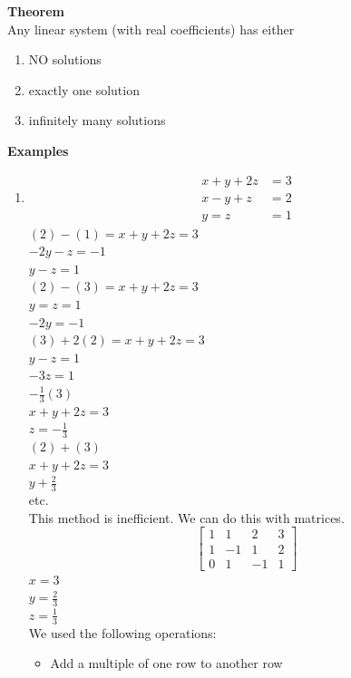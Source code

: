 \documentclass[]{article}
\begin{document}
		{\bf Theorem}\\
		Any linear system (with real coefficients) has either
		\begin{enumerate}
			\item NO solutions
			\item exactly one solution
			\item infinitely many solutions
		\end{enumerate}
		\pagebreak
		{\bf Examples}
		\begin{enumerate}
			\item \begin{align}
				x+y+2z&=3\\
				x-y+z&=2\\
				y=z&=1
			\end{align}
			$(2)-(1)=x+y+2z=3$\\
			$-2y-z=-1$\\
			\vspace{5mm}
			$y-z=1$\\
			$(2)-(3)=x+y+2z=3$\\
			$y=z=1$\\
			\vspace{5mm}
			$-2y=-1$\\
			$(3)+2(2)=x+y+2z=3$\\
			$y-z=1$\\
			\vspace{5mm}
			$-3z=1$\\
			$-\frac{1}{3}(3)$\\
			$x+y+2z=3$\\
			\vspace{5mm}
			$z=-\frac{1}{3}$\\
			$(2)+(3)$\\
			$x+y+2z=3$\\
			$y+\frac{2}{3}$\\
			etc.\\
			This method is inefficient. We can do this with matrices.
			$$
				\left[\begin{array}{ccc|c}
					{1}&{1}&{2}&{3}\\
					{1}&{-1}&{1}&{2}\\
					{0}&{1}&{-1}&{1}
				\end{array}\right]
			$$
			$x=3$\\
			$y=\frac{2}3$\\
			$z=\frac{1}3$\\
			We used the following operations:
			\begin{itemize}
				\item Add a multiple of one row to another row

\end{itemize}
\end{enumerate}
\end{document}
